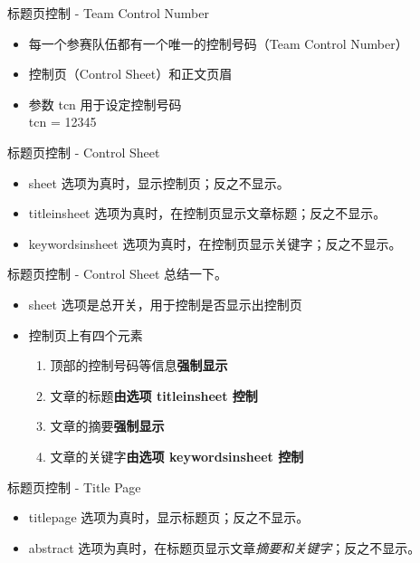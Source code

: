 \documentclass{beamer}
\begin{document}
\begin{frame}
\end{frame}

\begin{frame}{标题页控制 - Team Control Number}
  \begin{itemize}
    \item 每一个参赛队伍都有一个唯一的控制号码（Team Control Number）
    \item 控制页（Control Sheet）和正文页眉\pause
    \item 参数 tcn 用于设定控制号码\\
      tcn = 12345
  \end{itemize}
\end{frame}

\begin{frame}{标题页控制 - Control Sheet}
  \begin{itemize}
    \item sheet 选项为真时，显示控制页；反之不显示。\pause
    \item titleinsheet 选项为真时，在控制页显示文章标题；反之不显示。
    \item keywordsinsheet 选项为真时，在控制页显示关键字；反之不显示。
  \end{itemize}
\end{frame}

\begin{frame}{标题页控制 - Control Sheet}
  总结一下。
  \begin{itemize}
    \item sheet 选项是总开关，用于控制是否显示出控制页\pause
    \item 控制页上有四个元素\pause
      \begin{enumerate}
        \item 顶部的控制号码等信息\textbf{强制显示}\pause
        \item 文章的标题\textbf{由选项 titleinsheet 控制}\pause
        \item 文章的摘要\textbf{强制显示}\pause
        \item 文章的关键字\textbf{由选项 keywordsinsheet 控制}
      \end{enumerate}
  \end{itemize}
\end{frame}

\begin{frame}{标题页控制 - Title Page}
  \begin{itemize}
    \item titlepage 选项为真时，显示标题页；反之不显示。\pause
    \item abstract 选项为真时，在标题页显示文章\emph{摘要和关键字}；反之不显示。
  \end{itemize}
\end{frame}
\end{document}

